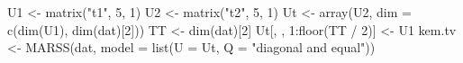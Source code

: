 \begin{Schunk}
\begin{Sinput}
 U1 <- matrix("t1", 5, 1)
 U2 <- matrix("t2", 5, 1)
 Ut <- array(U2, dim = c(dim(U1), dim(dat)[2]))
 TT <- dim(dat)[2]
 Ut[, , 1:floor(TT / 2)] <- U1
 kem.tv <- MARSS(dat, model = list(U = Ut, Q = "diagonal and equal"))
\end{Sinput}
\end{Schunk}
